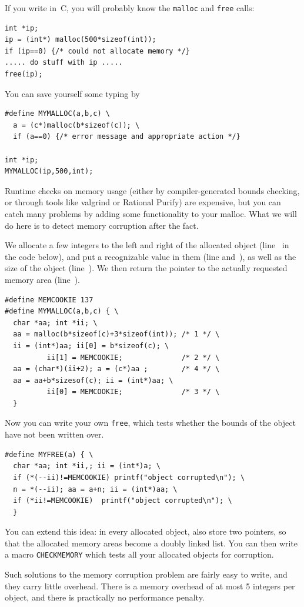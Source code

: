 If you write in~C, you will probably know the \lstinline{malloc} and \lstinline{free} calls:
\begin{lstlisting}
int *ip;
ip = (int*) malloc(500*sizeof(int));
if (ip==0) {/* could not allocate memory */}
..... do stuff with ip .....
free(ip);
\end{lstlisting}
You can save yourself some typing by
\begin{lstlisting}
#define MYMALLOC(a,b,c) \
  a = (c*)malloc(b*sizeof(c)); \
  if (a==0) {/* error message and appropriate action */}

int *ip;
MYMALLOC(ip,500,int);
\end{lstlisting}

Runtime checks on memory usage (either by compiler-generated bounds
checking, or through tools like
valgrind or Rational Purify) are expensive, but you can catch many
problems by adding some functionality to your malloc.
What we will do here is to detect memory corruption
after the fact. 

We allocate a few integers to the left and right of the
allocated object (line~ in the code below), 
and put a recognizable value in them (line \n{2} and~), as well as the
size of the object (line~\n{2}). We then return the pointer to the
actually requested memory area (line~\n{4}).
\begin{lstlisting}
#define MEMCOOKIE 137
#define MYMALLOC(a,b,c) { \
  char *aa; int *ii; \
  aa = malloc(b*sizeof(c)+3*sizeof(int)); /* 1 */ \
  ii = (int*)aa; ii[0] = b*sizeof(c); \
          ii[1] = MEMCOOKIE;              /* 2 */ \
  aa = (char*)(ii+2); a = (c*)aa ;        /* 4 */ \
  aa = aa+b*sizesof(c); ii = (int*)aa; \
          ii[0] = MEMCOOKIE;              /* 3 */ \
  }
\end{lstlisting}
Now you can write your own \lstinline{free}, which tests whether the bounds of
the object have not been written over.
\begin{lstlisting}
#define MYFREE(a) { \
  char *aa; int *ii,; ii = (int*)a; \
  if (*(--ii)!=MEMCOOKIE) printf("object corrupted\n"); \
  n = *(--ii); aa = a+n; ii = (int*)aa; \
  if (*ii!=MEMCOOKIE)  printf("object corrupted\n"); \
  }
\end{lstlisting}
You can extend this idea: in every allocated object, also store two
pointers, so that the allocated memory areas become a doubly linked
list. You can then write a macro \lstinline{CHECKMEMORY} which tests all your
allocated objects for corruption.

Such solutions to the memory corruption problem are fairly easy to
write, and they carry little overhead. There is a memory overhead of
at most 5 integers per object, and there is practically no performance
penalty.

